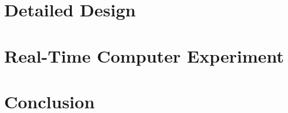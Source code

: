 \documentclass[letterpaper]{article} %
\begin{document}
\section{Detailed Design}
\label{sec:DetailedDesign}



\section{Real-Time Computer Experiment}
\label{sec:RealTimeComputerExperiment}


\section{Conclusion} \label{sec:conclusion}


% 
% 
\end{document}
